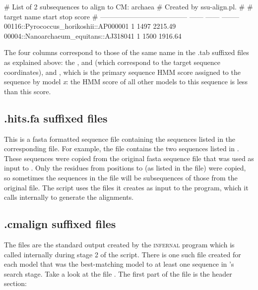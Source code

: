 \begin{sreoutput}
# List of 2 subsequences to align to CM: archaea
# Created by ssu-align.pl.
#
# target name                              start    stop     score
# --------------------------------------  ------  ------  --------
  00116::Pyrococcus_horikoshii::AP000001       1    1497   2215.49
  00004::Nanoarchaeum_equitans::AJ318041       1    1500   1916.64
\end{sreoutput}

The four columns correspond to those of the same name in the {.tab}
suffixed files as explained above: the ,
 and  (which correspond to the target sequence
coordinates), and , which is the primary sequence HMM
score assigned to the sequence by model \emph{x}: the HMM score of all
other models to this sequence is less than this score.

\subsection{.hits.fa suffixed files}
This is a fasta formatted sequence file containing the sequences
listed in the corresponding  file. For example, the
file  contains the two sequences
listed in . These sequences were
copied from the original fasta sequence file  that
was used as input to . Only the residues from
positions  to  (as listed in the
 file) were copied, so sometimes the sequences in the
 file will be subsequences of those from the original
file.  The  script uses the  files it
creates as input to the  program, which it calls
internally to generate the alignments.

\subsection{.cmalign suffixed files}

The  files are the standard output created by the
\textsc{infernal} program  which is called internally
during stage 2 of the  script. There is one such file
created for each model that was the best-matching model to at least
one sequence in 's search stage. Take a look at the
file . The first part of the file
is the header section:

